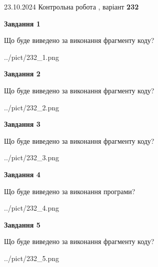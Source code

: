 \documentclass[12pt, ukrainian]{article}
\begin{document}
{\Large{23.10.2024 Контрольна робота , варіант  \No \textbf { 232 }\par}}
{
\begin {large}
{\begin {center}\textbf{Завдання 1}\end {center}}

Що буде виведено за виконання фрагменту коду?\par
\begin{center}
	{../pict/232_1.png}
\end{center}
\newpage

{\begin {center}\textbf{Завдання 2}\end {center}}

Що буде виведено за виконання фрагменту коду?\par
\begin{center}
	{../pict/232_2.png}
\end{center}
\newpage

{\begin {center}\textbf{Завдання 3}\end {center}}

Що буде виведено за виконання фрагменту коду?\par
\begin{center}
	{../pict/232_3.png}
\end{center}
\newpage

{\begin {center}\textbf{Завдання 4}\end {center}}

Що буде виведено за виконання програми?\par
\begin{center}
	{../pict/232_4.png}
\end{center}
\newpage

{\begin {center}\textbf{Завдання 5}\end {center}}

Що буде виведено за виконання фрагменту коду?\par
\begin{center}
	{../pict/232_5.png}
\end{center}
\newpage


\end{large}}
\end{document}
